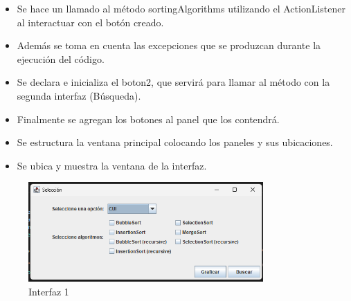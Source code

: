 \documentclass{article}
\begin{document}
    \begin{itemize}
        \begin{itemize}
            \item Se hace un llamado al método sortingAlgorithms utilizando el ActionListener al interactuar con el botón creado.
            \item Además se toma en cuenta las excepciones que se produzcan durante la ejecución del código.
        \end{itemize}
    \end{itemize}
    

    \begin{itemize}
        \begin{itemize}
            \item Se declara e inicializa el boton2, que servirá para llamar al método con la segunda interfaz (Búsqueda).
        \end{itemize}
    \end{itemize}
    

    \begin{itemize}
        \begin{itemize}
            \item Finalmente se agregan los botones al panel que los contendrá.
            \item Se estructura la ventana principal colocando los paneles y sus ubicaciones.
            \item Se ubica y muestra la ventana de la interfaz.
        \end{itemize}
    \end{itemize}
    

    \begin{figure}[H]
        \centering
	\includegraphics[width=0.8\textwidth,keepaspectratio]{img/Interfaz1.png}
        \caption{Interfaz 1}
    \end{figure}
    
\end{document}
